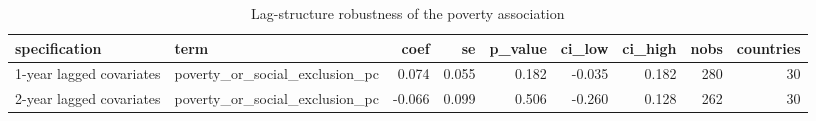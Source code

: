 \begin{table}
\caption{Lag-structure robustness of the poverty association}
\label{tab:regression_lag_robustness}
\begin{tabular}{llrrrrrrr}
\toprule
specification & term & coef & se & p\_value & ci\_low & ci\_high & nobs & countries \\
\midrule
1-year lagged covariates & poverty\_or\_social\_exclusion\_pc & 0.074 & 0.055 & 0.182 & -0.035 & 0.182 & 280 & 30 \\
2-year lagged covariates & poverty\_or\_social\_exclusion\_pc & -0.066 & 0.099 & 0.506 & -0.260 & 0.128 & 262 & 30 \\
\bottomrule
\end{tabular}
\end{table}
